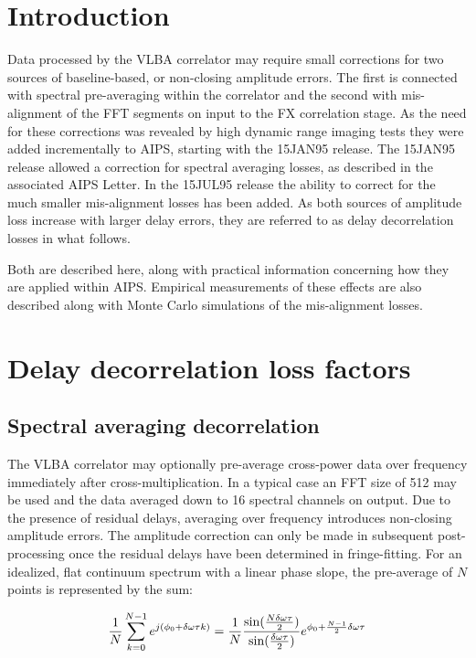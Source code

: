 \section{Introduction}

Data processed by the VLBA correlator may require small corrections
for two sources of baseline-based, or non-closing amplitude
errors. The first is connected with spectral pre-averaging within the
correlator and the second with mis-alignment of the FFT segments on
input to the FX correlation stage. As the need for these corrections
was revealed by high dynamic range imaging tests they were added
incrementally to AIPS, starting with the 15JAN95 release. The 15JAN95
release allowed a correction for spectral averaging losses, as
described in the associated AIPS Letter. In the 15JUL95 release the
ability to correct for the much smaller mis-alignment losses has been
added. As both sources of amplitude loss increase with larger delay
errors, they are referred to as delay decorrelation losses in what
follows.

Both are described here, along with practical information concerning
how they are applied within AIPS. Empirical measurements of these
effects are also described along with Monte Carlo simulations of the
mis-alignment losses.


\section{Delay decorrelation loss factors}
\subsection{Spectral averaging decorrelation}

The VLBA correlator may optionally pre-average cross-power data over
frequency immediately after cross-multiplication. In a typical case an
FFT size of 512 may be used and the data averaged down to 16 spectral
channels on output. Due to the presence of residual delays, averaging
over frequency introduces non-closing amplitude errors.  The amplitude
correction can only be made in subsequent post-processing once the
residual delays have been determined in fringe-fitting. For an
idealized, flat continuum spectrum with a linear phase slope, the
pre-average of $N$ points is represented by the sum:

$${{1}\over{N}} \sum_{k=0}^{N-1} e^{j(\phi_0 + \delta \omega \tau k)}
= {{1}\over{N}} {{\sin({{N \delta \omega \tau}\over{2}})} \over
{\sin({{ \delta \omega \tau}\over{2}})}} e^{\phi_0 + {{N-1}\over{2}}
\delta \omega \tau}$$


